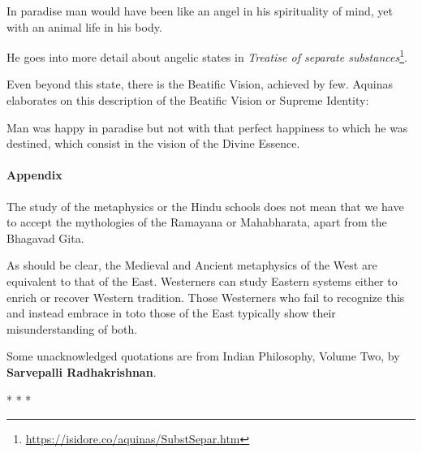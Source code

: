 \begin{quotex}
In paradise man would have been like an angel in his spirituality of mind, yet with an animal life in his body. 

\end{quotex}
He goes into more detail about angelic states in \textit{Treatise of separate substances}\footnote{\url{https://isidore.co/aquinas/SubstSepar.htm}}.

Even beyond this state, there is the Beatific Vision, achieved by few. Aquinas elaborates on this description of the Beatific Vision or Supreme Identity:

\begin{quotex}
Man was happy in paradise but not with that perfect happiness to which he was destined, which consist in the vision of the Divine Essence. 

\end{quotex}

\paragraph{Appendix}
The study of the metaphysics or the Hindu schools does not mean that we have to accept the mythologies of the Ramayana or Mahabharata, apart from the Bhagavad Gita.

As should be clear, the Medieval and Ancient metaphysics of the West are equivalent to that of the East. Westerners can study Eastern systems either to enrich or recover Western tradition. Those Westerners who fail to recognize this and instead embrace in toto those of the East typically show their misunderstanding of both.

Some unacknowledged quotations are from Indian Philosophy, Volume Two, by \textbf{Sarvepalli Radhakrishnan}.


\begin{center}* * *\end{center}

